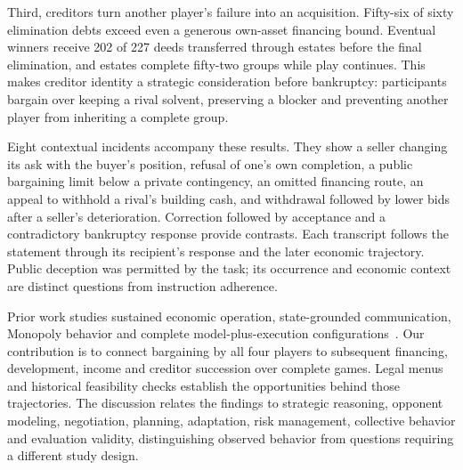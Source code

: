 Third, creditors turn another player's failure into an acquisition. Fifty-six of sixty elimination debts exceed even a generous own-asset financing bound. Eventual winners receive 202 of 227 deeds transferred through estates before the final elimination, and estates complete fifty-two groups while play continues. This makes creditor identity a strategic consideration before bankruptcy: participants bargain over keeping a rival solvent, preserving a blocker and preventing another player from inheriting a complete group.

Eight contextual incidents accompany these results. They show a seller changing its ask with the buyer's position, refusal of one's own completion, a public bargaining limit below a private contingency, an omitted financing route, an appeal to withhold a rival's building cash, and withdrawal followed by lower bids after a seller's deterioration. Correction followed by acceptance and a contradictory bankruptcy response provide contrasts. Each transcript follows the statement through its recipient's response and the later economic trajectory. Public deception was permitted by the task; its occurrence and economic context are distinct questions from instruction adherence.

Prior work studies sustained economic operation, state-grounded communication, Monopoly behavior and complete model-plus-execution configurations~\cite{backlund2025vendingbench,li2026arena,wu2026agentmonopoly,hu2026finboardbench,zhang2026dece}. Our contribution is to connect bargaining by all four players to subsequent financing, development, income and creditor succession over complete games. Legal menus and historical feasibility checks establish the opportunities behind those trajectories. The discussion relates the findings to strategic reasoning, opponent modeling, negotiation, planning, adaptation, risk management, collective behavior and evaluation validity, distinguishing observed behavior from questions requiring a different study design.
